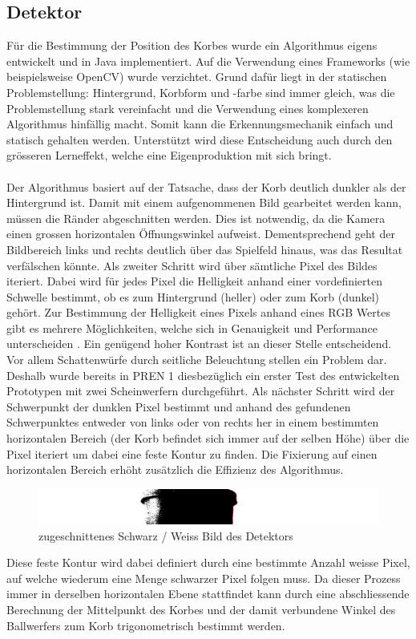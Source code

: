 \subsection{Detektor}
	Für die Bestimmung der Position des Korbes wurde ein Algorithmus 
	eigens entwickelt und in Java implementiert. Auf die Verwendung eines 
	Frameworks (wie beispielsweise OpenCV) wurde verzichtet. Grund dafür 
	liegt in der statischen Problemstellung: Hintergrund, Korbform und -farbe 
	sind immer gleich, was die Problemstellung stark vereinfacht und die Verwendung eines komplexeren Algorithmus hinfällig macht. Somit kann die Erkennungsmechanik einfach und statisch gehalten werden. Unterstützt wird diese Entscheidung auch durch den grösseren Lerneffekt, welche eine Eigenproduktion mit sich bringt. \\
	\\
	Der Algorithmus 
	basiert auf der Tatsache, dass der Korb deutlich dunkler als der 
	Hintergrund ist. Damit mit einem aufgenommenen Bild gearbeitet werden kann, 
	müssen die Ränder abgeschnitten werden. Dies ist notwendig, da die Kamera einen 
	grossen horizontalen Öffnungswinkel aufweist. Dementsprechend geht der 
	Bildbereich links und rechts deutlich über das Spielfeld 
	hinaus, was das Resultat verfälschen könnte. Als zweiter Schritt wird 
	über sämtliche Pixel des Bildes iteriert. Dabei wird für jedes Pixel die 
	Helligkeit anhand einer vordefinierten Schwelle bestimmt, ob es zum 
	Hintergrund (heller) oder zum Korb (dunkel) gehört. Zur Bestimmung der Helligkeit eines Pixels anhand eines RGB Wertes gibt es mehrere Möglichkeiten, welche sich in Genauigkeit und Performance unterscheiden \cite{S:RGB}. Ein genügend hoher 
	Kontrast ist an dieser Stelle entscheidend. Vor allem Schattenwürfe durch 
	seitliche Beleuchtung stellen ein Problem dar. Deshalb wurde bereits in PREN 1 diesbezüglich 
	ein erster Test des entwickelten Prototypen mit zwei Scheinwerfern 
	durchgeführt. Als nächster Schritt 
	wird der Schwerpunkt der dunklen Pixel bestimmt und anhand des gefundenen 
	Schwerpunktes entweder von links oder von rechts her in einem bestimmten 
	horizontalen Bereich (der Korb befindet sich immer auf der selben Höhe)
	über die Pixel iteriert um dabei eine feste Kontur zu finden. Die Fixierung auf einen horizontalen Bereich erhöht zusätzlich die Effizienz des Algorithmus. 
	
	\begin{figure}[h!]
		\includegraphics[width=1 \textwidth,clip] 
		{Enddokumentation/Bilder/EditedPicture.jpg}
		\centering
		\caption{zugeschnittenes Schwarz / Weiss Bild des Detektors}
		\label{abb:editedPicture}
	\end{figure}
	
	Diese feste 
	Kontur wird dabei definiert durch eine bestimmte Anzahl weisse Pixel, auf 
	welche wiederum eine Menge schwarzer Pixel folgen muss. Da dieser Prozess 
	immer in derselben horizontalen Ebene stattfindet kann durch eine 
	abschliessende Berechnung der Mittelpunkt des Korbes und der damit 
	verbundene Winkel des Ballwerfers zum Korb trigonometrisch bestimmt werden.
